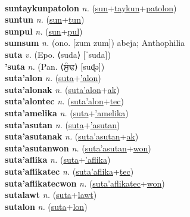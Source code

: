  \label{sunkwelweltolmicualon} \\
\textbf{suntaykunpatolon} \textit{n.} (\hyperref[sun]{sun}+\hyperref[taykun]{taykun}+\hyperref[patolon]{patolon})
 \label{suntaykunpatolon} \\
\textbf{suntun} \textit{n.} (\hyperref[sun]{sun}+\hyperref[tun]{tun})
 \label{suntun} \\
\textbf{sunpul} \textit{n.} (\hyperref[sun]{sun}+\hyperref[pul]{pul})
 \label{sunpul} \\
\textbf{sumsum} \textit{n.} (ono. [zum zum])
abeja; Anthophilia \label{sumsum} \\
\textbf{suta} \textit{v.} (Epo. ⟨suda⟩ [ˈsuda])
 \label{suta} \\
\textbf{'suta} \textit{n.} (Pan. ⟨ਸੁੰਢ⟩ [suɖə])
 \label{'suta} \\
\textbf{suta'alon} \textit{n.} (\hyperref[suta]{suta}+\hyperref['alon]{'alon})
 \label{suta'alon} \\
\textbf{suta'alonak} \textit{n.} (\hyperref[suta'alon]{suta'alon}+\hyperref[ak]{ak})
 \label{suta'alonak} \\
\textbf{suta'alontec} \textit{n.} (\hyperref[suta'alon]{suta'alon}+\hyperref[tec]{tec})
 \label{suta'alontec} \\
\textbf{suta'amelika} \textit{n.} (\hyperref[suta]{suta}+\hyperref['amelika]{'amelika})
 \label{suta'amelika} \\
\textbf{suta'asutan} \textit{n.} (\hyperref[suta]{suta}+\hyperref['asutan]{'asutan})
 \label{suta'asutan} \\
\textbf{suta'asutanak} \textit{n.} (\hyperref[suta'asutan]{suta'asutan}+\hyperref[ak]{ak})
 \label{suta'asutanak} \\
\textbf{suta'asutanwon} \textit{n.} (\hyperref[suta'asutan]{suta'asutan}+\hyperref[won]{won})
 \label{suta'asutanwon} \\
\textbf{suta'aflika} \textit{n.} (\hyperref[suta]{suta}+\hyperref['aflika]{'aflika})
 \label{suta'aflika} \\
\textbf{suta'aflikatec} \textit{n.} (\hyperref[suta'aflika]{suta'aflika}+\hyperref[tec]{tec})
 \label{suta'aflikatec} \\
\textbf{suta'aflikatecwon} \textit{n.} (\hyperref[suta'aflikatec]{suta'aflikatec}+\hyperref[won]{won})
 \label{suta'aflikatecwon} \\
\textbf{sutalawt} \textit{n.} (\hyperref[suta]{suta}+\hyperref[lawt]{lawt})
 \label{sutalawt} \\
\textbf{sutalon} \textit{n.} (\hyperref[suta]{suta}+\hyperref[lon]{lon})
